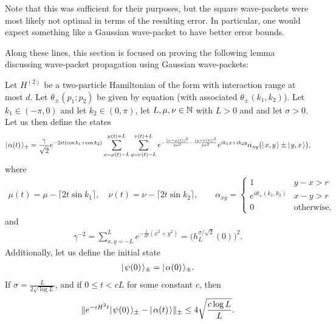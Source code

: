 \documentclass[../thesis-main/thesis-main]{subfiles}
\begin{document}
Note that this was sufficient for their purposes, but the square wave-packets were most likely not optimal in terms of the resulting error.  In particular, one would expect something like a Gaussian wave-packet to have better error bounds.  

Along these lines, this section is focused on proving the following lemma discussing wave-packet propagation using Gaussian wave-packets:
\begin{theorem}
Let $H^{(2)}$ be a two-particle Hamiltonian of the form  with interaction range at most $d$.  Let $\theta_{\pm}(p_1;p_2)$ be given by equation  (with associated $\theta_{\pm}(k_1,k_2)$).  Let $k_1\in (-\pi,0)$ and let $k_2 \in (0,\pi)$, let $L,\mu, \nu \in \mathbb{N}$ with $L>0$ and and let $\sigma > 0$.  Let us then define the states
\begin{align}
  |\mspace{2mu} \alpha(t) \mspace{2mu} \rangle_{\pm} = \frac{\gamma}{\sqrt{2}} e^{-2i t (\cos k_1 + \cos k_2)} \sum_{x = \mu(t)-L}^{\mu(t)+L} \sum_{y = \nu(t) -L}^{\nu(t)+L} e^{ -\frac{ (x-\mu(t))^2}{2\sigma^2} - \frac{(y-\nu(t))^2}{2\sigma^2}} e^{i k_1 x + i k_2 y} \alpha_{xy} \big( |\mspace{2mu} x,y \mspace{2mu} \rangle \pm |\mspace{2mu} y,x \mspace{2mu} \rangle\big),
\end{align}
where
\begin{align}
  \mu(t) = \mu - \lceil 2 t \sin k_1\rceil, \quad
  \nu(t) = \nu - \lceil 2 t \sin k_2\rceil, \qquad
  \alpha_{xy} = \begin{cases} 1  & y-x > r\\
  e^{i\theta_\pm(k_1,k_2)} & x-y > r\\
  0 & \text{otherwise},
  \end{cases}
\end{align}
and
\begin{align}
  \gamma^{-2} = \sum_{x,y=-L}^L e^{-\frac{1}{\sigma^2}(x^2+y^2)} = \Big(h_L^{\sigma/\sqrt{2}}(0)\Big)^2.
\end{align}
Additionally, let us define the initial state
\begin{align}
  |\mspace{2mu} \psi(0) \mspace{2mu} \rangle_{\pm} = |\mspace{2mu} \alpha(0) \mspace{2mu} \rangle_{\pm}.
\end{align}
If $\sigma = \frac{ L}{2\sqrt{\log L}}$, and if $0 \leq t < c L$ for some constant $c$, then 
\begin{align}
  \|{e^{ - i H^2 t} |\mspace{2mu} \psi(0) \mspace{2mu} \rangle_{\pm} - |\mspace{2mu} \alpha(t) \mspace{2mu} \rangle}\|_{\pm} \leq 4 \sqrt{\frac{c\log L}{L}}.
\end{align}
\label{thm:two_particle_wave-packet_bound}
\end{theorem}
\end{document}
